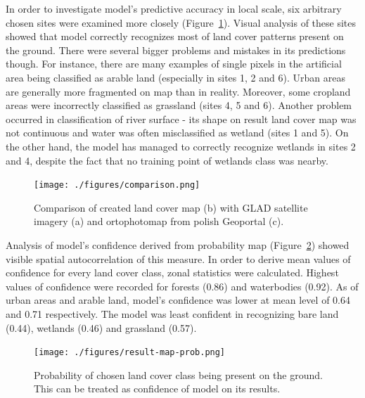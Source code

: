 \documentclass{amuthesis}
\begin{document}
In order to investigate model's predictive accuracy in local scale, six
arbitrary chosen sites were examined more closely
(Figure~\ref{fig-rycina10}). Visual analysis of these sites showed that
model correctly recognizes most of land cover patterns present on the
ground. There were several bigger problems and mistakes in its
predictions though. For instance, there are many examples of single
pixels in the artificial area being classified as arable land
(especially in sites 1, 2 and 6). Urban areas are generally more
fragmented on map than in reality. Moreover, some cropland areas were
incorrectly classified as grassland (sites 4, 5 and 6). Another problem
occurred in classification of river surface - its shape on result land
cover map was not continuous and water was often misclassified as
wetland (sites 1 and 5). On the other hand, the model has managed to
correctly recognize wetlands in sites 2 and 4, despite the fact that no
training point of wetlands class was nearby.

\begin{figure}[t]

{\centering \texttt{[image: ./figures/comparison.png]}

}

\caption{\label{fig-rycina10}Comparison of created land cover map (b)
with GLAD satellite imagery (a) and ortophotomap from polish Geoportal
(c).}

\end{figure}

Analysis of model's confidence derived from probability map
(Figure~\ref{fig-rycina11}) showed visible spatial autocorrelation of
this measure. In order to derive mean values of confidence for every
land cover class, zonal statistics were calculated. Highest values of
confidence were recorded for forests (0.86) and waterbodies (0.92). As
of urban areas and arable land, model's confidence was lower at mean
level of 0.64 and 0.71 respectively. The model was least confident in
recognizing bare land (0.44), wetlands (0.46) and grassland (0.57).

\begin{figure}[t]

{\centering \texttt{[image: ./figures/result-map-prob.png]}

}

\caption{\label{fig-rycina11}Probability of chosen land cover class
being present on the ground. This can be treated as confidence of model
on its results.}

\end{figure}
\end{document}
